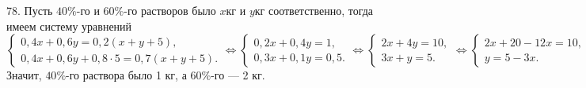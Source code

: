 78. Пусть $40\%$-го и $60\%$-го растворов было $x$кг и $y$кг соответственно, тогда имеем систему уравнений $\begin{cases}
0,4x+0,6y=0,2(x+y+5),\\ 0,4x+0,6y+0,8\cdot5=0,7(x+y+5).\end{cases}\Leftrightarrow\begin{cases}
0,2x+0,4y=1,\\ 0,3x+0,1y=0,5.\end{cases}\Leftrightarrow\begin{cases}
2x+4y=10,\\ 3x+y=5.\end{cases}\Leftrightarrow\begin{cases}
2x+20-12x=10,\\ y=5-3x.\end{cases}\Leftrightarrow\begin{cases}
x=1,\\ y=2.\end{cases}$ Значит, $40\%$-го раствора было 1 кг, а $60\%$-го --- 2 кг.\\
